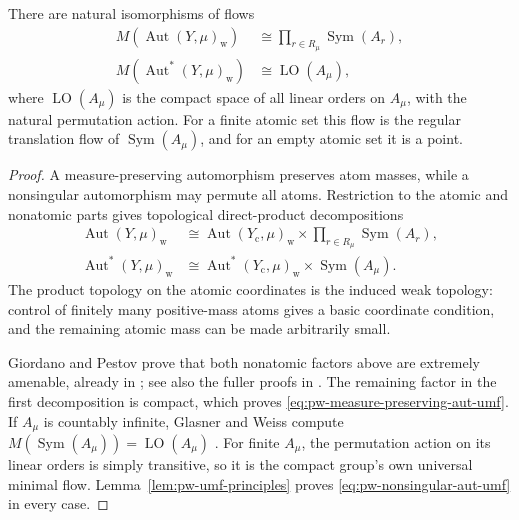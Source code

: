 \begin{theorem}\label{thm:pw-measure-aut-umf}
There are natural isomorphisms of flows
\begin{align}
M(\operatorname{Aut}(Y,\mu)_{\mathrm w})
 &\cong \prod_{r\in R_\mu}\operatorname{Sym}(A_r),
 \label{eq:pw-measure-preserving-aut-umf}\\
M(\operatorname{Aut}^*(Y,\mu)_{\mathrm w})
 &\cong \operatorname{LO}(A_\mu),
 \label{eq:pw-nonsingular-aut-umf}
\end{align}
where \(\operatorname{LO}(A_\mu)\) is the compact space of all linear orders
on \(A_\mu\), with the natural permutation action. For a finite atomic set this
flow is the regular translation flow of \(\operatorname{Sym}(A_\mu)\), and for
an empty atomic set it is a point.
\end{theorem}

\begin{proof}
A measure-preserving automorphism preserves atom masses, while a nonsingular
automorphism may permute all atoms. Restriction to the atomic and nonatomic
parts gives topological direct-product decompositions
\begin{align*}
\operatorname{Aut}(Y,\mu)_{\mathrm w}
 &\cong \operatorname{Aut}(Y_{\mathrm c},\mu)_{\mathrm w}
   \times\prod_{r\in R_\mu}\operatorname{Sym}(A_r),\\
\operatorname{Aut}^*(Y,\mu)_{\mathrm w}
 &\cong \operatorname{Aut}^*(Y_{\mathrm c},\mu)_{\mathrm w}
   \times\operatorname{Sym}(A_\mu).
\end{align*}
The product topology on the atomic coordinates is the induced weak topology:
control of finitely many positive-mass atoms gives a basic coordinate
condition, and the remaining atomic mass can be made arbitrarily small.

Giordano and Pestov prove that both nonatomic factors above are extremely
amenable, already in \cite[Theorems~2.1 and~2.4]{GiordanoPestov2002}; see also the fuller
proofs in \cite[Theorem~4.2 and Theorem~6.1]{GiordanoPestov2007}. The remaining factor in the
first decomposition is compact, which proves
\eqref{eq:pw-measure-preserving-aut-umf}. If \(A_\mu\) is countably infinite,
Glasner and Weiss compute
\(M(\operatorname{Sym}(A_\mu))=\operatorname{LO}(A_\mu)\)
\cite{GlasnerWeiss2002}. For finite \(A_\mu\), the permutation action on its linear orders
is simply transitive, so it is the compact group's own universal minimal flow.
Lemma~\ref{lem:pw-umf-principles} proves
\eqref{eq:pw-nonsingular-aut-umf} in every case.
\end{proof}

